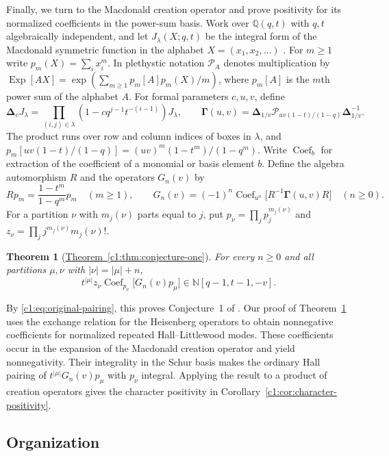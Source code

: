 \documentclass[12pt,reqno,a4paper]{amsart}
\numberwithin{equation}{section}
\numberwithin{figure}{section}
\theoremstyle{plain}
\newtheorem{mainthm}{Theorem}
\theoremstyle{definition}
\DeclareMathOperator{\Coef}{Coef}
\begin{document}
Finally, we turn to the Macdonald creation operator and prove positivity
for its normalized coefficients in the power-sum basis.  Work over $\mathbb Q(q,t)$
with $q,t$ algebraically independent, and let $J_\lambda(X;q,t)$ be the integral
form of the Macdonald symmetric function in the alphabet
$X=(x_1,x_2,\ldots)$ \cite[Chapter~VI, (8.3)]{Macdonald}.
For $m\geq1$ write $p_m(X)=\sum_i x_i^m$.  In plethystic notation
$\mathcal P_A$ denotes multiplication by
$\operatorname{Exp}[AX]=\exp(\sum_{m\geq1}p_m[A]p_m(X)/m)$,
where $p_m[A]$ is the $m$th power sum of the alphabet $A$.
For formal parameters $c,u,v$, define
\[
 \boldsymbol\Delta_cJ_\lambda
 =\prod_{(i,j)\in\lambda}(1-cq^{j-1}t^{-(i-1)})J_\lambda,
 \qquad
 \boldsymbol\Gamma(u,v)
 =\boldsymbol\Delta_{1/v}\mathcal P_{uv(1-t)/(1-q)}
     \boldsymbol\Delta_{1/v}^{-1}.
\]
The product runs over row and column indices of boxes in $\lambda$,
and $p_m[uv(1-t)/(1-q)]=(uv)^m(1-t^m)/(1-q^m)$.
Write $\Coef_b$ for extraction of the coefficient of a monomial or
basis element $b$.  Define the algebra automorphism $R$ and the
operators $G_n(v)$ by
\[
 Rp_m=\frac{1-t^m}{1-q^m}p_m\quad(m\geq1),\qquad
 G_n(v)=(-1)^n\Coef_{u^n}\bigl[R^{-1}\boldsymbol\Gamma(u,v)R\bigr]
 \quad(n\geq0).
\]
For a partition $\nu$ with $m_j(\nu)$ parts equal to $j$, put
$p_\nu=\prod_jp_j^{m_j(\nu)}$ and
$z_\nu=\prod_jj^{m_j(\nu)}m_j(\nu)!$.

\begin{mainthm}[{\hyperref[c1:thm:conjecture-one]{Theorem~\ref*{c1:thm:conjecture-one}}}]
\label{thm:intro-c1}
For every $n\geq0$ and all partitions $\mu,\nu$ with
$|\nu|=|\mu|+n$,
\[
 t^{|\mu|}z_\nu\Coef_{p_\nu}\bigl[G_n(v)p_\mu\bigr]
 \in\mathbb N[q-1,t-1,-v].
\]
\end{mainthm}

By \eqref{c1:eq:original-pairing}, this proves Conjecture~1 of
\cite{BD26}.  Our proof of Theorem~\ref{thm:intro-c1} uses the exchange
relation for the Heisenberg operators to obtain nonnegative coefficients for normalized repeated
Hall--Littlewood modes.  These coefficients occur in the expansion
of the Macdonald creation operator and yield nonnegativity.
Their integrality in the Schur basis makes the ordinary Hall pairing
of $t^{|\mu|}G_n(v)p_\mu$ with $p_\nu$ integral.  Applying the result
to a product of creation operators
gives the character positivity in Corollary~\ref{c1:cor:character-positivity}.

\subsection{Organization}
\end{document}
